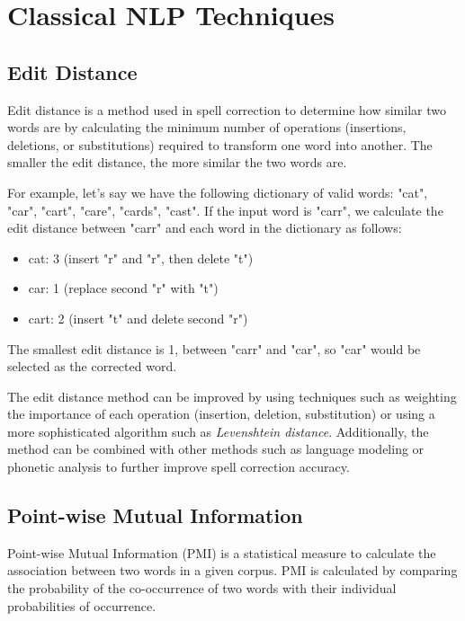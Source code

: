 \chapter{Classical NLP Techniques}

\section{Edit Distance}
\label{sec:nlp_edit_distance}

Edit distance is a method used in spell correction to determine how similar two words are by calculating the minimum number of operations (insertions, deletions, or substitutions) required to transform one word into another. The smaller the edit distance, the more similar the two words are.

For example, let's say we have the following dictionary of valid words: "cat", "car", "cart", "care", "cards", "cast". If the input word is "carr", we calculate the edit distance between "carr" and each word in the dictionary as follows:

\begin{itemize}
	\item cat: 3 (insert "r" and "r", then delete "t")
	\item car: 1 (replace second "r" with "t")
	\item cart: 2 (insert "t" and delete second "r")
\end{itemize}

The smallest edit distance is 1, between "carr" and "car", so "car" would be selected as the corrected word.

The edit distance method can be improved by using techniques such as weighting the importance of each operation (insertion, deletion, substitution) or using a more sophisticated algorithm such as \textit{Levenshtein distance}. Additionally, the method can be combined with other methods such as language modeling or phonetic analysis to further improve spell correction accuracy.

\section{Point-wise Mutual Information}
\label{sec:nlp_pmi}

Point-wise Mutual Information (PMI) is a statistical measure to calculate the association between two words in a given corpus. PMI is calculated by comparing the probability of the co-occurrence of two words with their individual probabilities of occurrence.

